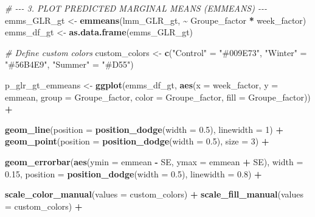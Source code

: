 \documentclass[
]{article}
\newenvironment{Shaded}{\begin{snugshade}}{\end{snugshade}}
\newcommand{\AttributeTok}[1]{\textcolor[rgb]{0.13,0.29,0.53}{#1}}
\newcommand{\CommentTok}[1]{\textcolor[rgb]{0.56,0.35,0.01}{\textit{#1}}}
\newcommand{\DecValTok}[1]{\textcolor[rgb]{0.00,0.00,0.81}{#1}}
\newcommand{\FloatTok}[1]{\textcolor[rgb]{0.00,0.00,0.81}{#1}}
\newcommand{\FunctionTok}[1]{\textcolor[rgb]{0.13,0.29,0.53}{\textbf{#1}}}
\newcommand{\NormalTok}[1]{#1}
\newcommand{\OtherTok}[1]{\textcolor[rgb]{0.56,0.35,0.01}{#1}}
\newcommand{\SpecialCharTok}[1]{\textcolor[rgb]{0.81,0.36,0.00}{\textbf{#1}}}
\newcommand{\StringTok}[1]{\textcolor[rgb]{0.31,0.60,0.02}{#1}}
\begin{document}
\begin{Shaded}
\begin{Highlighting}[]
\CommentTok{\# {-}{-}{-} 3. PLOT PREDICTED MARGINAL MEANS (EMMEANS) {-}{-}{-}}
\NormalTok{emms\_GLR\_gt }\OtherTok{\textless{}{-}} \FunctionTok{emmeans}\NormalTok{(lmm\_GLR\_gt, }\SpecialCharTok{\textasciitilde{}}\NormalTok{ Groupe\_factor }\SpecialCharTok{*}\NormalTok{ week\_factor)}
\NormalTok{emms\_df\_gt }\OtherTok{\textless{}{-}} \FunctionTok{as.data.frame}\NormalTok{(emms\_GLR\_gt)}

\CommentTok{\# Define custom colors}
\NormalTok{custom\_colors }\OtherTok{\textless{}{-}} \FunctionTok{c}\NormalTok{(}\StringTok{"Control"} \OtherTok{=} \StringTok{"\#009E73"}\NormalTok{, }\StringTok{"Winter"} \OtherTok{=} \StringTok{"\#56B4E9"}\NormalTok{, }\StringTok{"Summer"} \OtherTok{=} \StringTok{"\#D55"}\NormalTok{)}

\NormalTok{p\_glr\_gt\_emmeans }\OtherTok{\textless{}{-}} \FunctionTok{ggplot}\NormalTok{(emms\_df\_gt, }\FunctionTok{aes}\NormalTok{(}\AttributeTok{x =}\NormalTok{ week\_factor, }\AttributeTok{y =}\NormalTok{ emmean, }\AttributeTok{group =}\NormalTok{ Groupe\_factor, }\AttributeTok{color =}\NormalTok{ Groupe\_factor, }\AttributeTok{fill =}\NormalTok{ Groupe\_factor)) }\SpecialCharTok{+}
  
  \FunctionTok{geom\_line}\NormalTok{(}\AttributeTok{position =} \FunctionTok{position\_dodge}\NormalTok{(}\AttributeTok{width =} \FloatTok{0.5}\NormalTok{), }\AttributeTok{linewidth =} \DecValTok{1}\NormalTok{) }\SpecialCharTok{+}
  \FunctionTok{geom\_point}\NormalTok{(}\AttributeTok{position =} \FunctionTok{position\_dodge}\NormalTok{(}\AttributeTok{width =} \FloatTok{0.5}\NormalTok{), }\AttributeTok{size =} \DecValTok{3}\NormalTok{) }\SpecialCharTok{+}
  
  \FunctionTok{geom\_errorbar}\NormalTok{(}\FunctionTok{aes}\NormalTok{(}\AttributeTok{ymin =}\NormalTok{ emmean }\SpecialCharTok{{-}}\NormalTok{ SE, }\AttributeTok{ymax =}\NormalTok{ emmean }\SpecialCharTok{+}\NormalTok{ SE), }
                \AttributeTok{width =} \FloatTok{0.15}\NormalTok{, }\AttributeTok{position =} \FunctionTok{position\_dodge}\NormalTok{(}\AttributeTok{width =} \FloatTok{0.5}\NormalTok{), }\AttributeTok{linewidth =} \FloatTok{0.8}\NormalTok{) }\SpecialCharTok{+}
  
  \FunctionTok{scale\_color\_manual}\NormalTok{(}\AttributeTok{values =}\NormalTok{ custom\_colors) }\SpecialCharTok{+}
  \FunctionTok{scale\_fill\_manual}\NormalTok{(}\AttributeTok{values =}\NormalTok{ custom\_colors) }\SpecialCharTok{+}
  

\end{Highlighting}
\end{Shaded}
\end{document}
